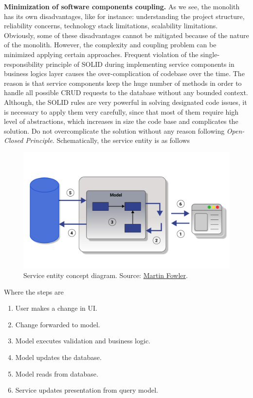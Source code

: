 \textbf{Minimization of software components coupling.} As we see, the monolith has its own disadvantages, like for instance:
understanding the project structure, reliability concerns, technology stack limitations, scalability limitations.
Obviously, some of these disadvantages cannot be mitigated because of the nature of the monolith.
However, the complexity and coupling problem can be minimized applying certain approaches.
Frequent violation of the single-responsibility principle of SOLID during implementing service components
in business logics layer causes the over-complication of codebase over the time.
The reason is that service components keep the huge number of methods in order to handle all possible CRUD requests
to the database without any bounded context.
Although, the SOLID rules are very powerful in solving designated code issues, it is necessary to apply them very carefully,
since that most of them require high level of abstractions, which increases in size the code base and complicates the
solution.
Do not overcomplicate the solution without any reason following \textit{Open-Closed Principle}.
Schematically, the service entity is as follows
\begin{figure}[H]
    \centering
    \includegraphics[width=1\textwidth]{Pictures/04_Service_entity_concept_diagram}
    \caption{Service entity concept diagram.
    Source: \href{https://martinfowler.com/bliki/CQRS.html}{Martin Fowler}.}\label{fig:figure9}
\end{figure}
Where the steps are
\begin{enumerate}
    \item User makes a change in UI\@.
    \item Change forwarded to model.
    \item Model executes validation and business logic.
    \item Model updates the database.
    \item Model reads from database.
    \item Service updates presentation from query model.
\end{enumerate}

